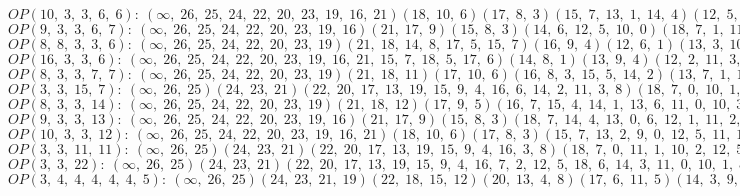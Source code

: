 $OP(10, \;3, \;3, \;6, \;6): \:(\infty, \;26, \;25, \;24, \;22, \;20, \;23, \;19, \;16, \;21)(18, \;10, \;6)(17, \;8, \;3)(15, \;7, \;13, \;1, \;14, \;4)(12, \;5, \;11, \;0, \;9, \;2)$\\
$OP(9, \;3, \;3, \;6, \;7): \:(\infty, \;26, \;25, \;24, \;22, \;20, \;23, \;19, \;16)(21, \;17, \;9)(15, \;8, \;3)(14, \;6, \;12, \;5, \;10, \;0)(18, \;7, \;1, \;11, \;2, \;13, \;4)$\\
$OP(8, \;8, \;3, \;3, \;6): \:(\infty, \;26, \;25, \;24, \;22, \;20, \;23, \;19)(21, \;18, \;14, \;8, \;17, \;5, \;15, \;7)(16, \;9, \;4)(12, \;6, \;1)(13, \;3, \;10, \;2, \;11, \;0)$\\
$OP(16, \;3, \;3, \;6): \:(\infty, \;26, \;25, \;24, \;22, \;20, \;23, \;19, \;16, \;21, \;15, \;7, \;18, \;5, \;17, \;6)(14, \;8, \;1)(13, \;9, \;4)(12, \;2, \;11, \;3, \;10, \;0)$\\
$OP(8, \;3, \;3, \;7, \;7): \:(\infty, \;26, \;25, \;24, \;22, \;20, \;23, \;19)(21, \;18, \;11)(17, \;10, \;6)(16, \;8, \;3, \;15, \;5, \;14, \;2)(13, \;7, \;1, \;12, \;4, \;9, \;0)$\\
$OP(3, \;3, \;15, \;7): \:(\infty, \;26, \;25)(24, \;23, \;21)(22, \;20, \;17, \;13, \;19, \;15, \;9, \;4, \;16, \;6, \;14, \;2, \;11, \;3, \;8)(18, \;7, \;0, \;10, \;1, \;12, \;5)$\\
$OP(8, \;3, \;3, \;14): \:(\infty, \;26, \;25, \;24, \;22, \;20, \;23, \;19)(21, \;18, \;12)(17, \;9, \;5)(16, \;7, \;15, \;4, \;14, \;1, \;13, \;6, \;11, \;0, \;10, \;3, \;8, \;2)$\\
$OP(9, \;3, \;3, \;13): \:(\infty, \;26, \;25, \;24, \;22, \;20, \;23, \;19, \;16)(21, \;17, \;9)(15, \;8, \;3)(18, \;7, \;14, \;4, \;13, \;0, \;6, \;12, \;1, \;11, \;2, \;10, \;5)$\\
$OP(10, \;3, \;3, \;12): \:(\infty, \;26, \;25, \;24, \;22, \;20, \;23, \;19, \;16, \;21)(18, \;10, \;6)(17, \;8, \;3)(15, \;7, \;13, \;2, \;9, \;0, \;12, \;5, \;11, \;1, \;14, \;4)$\\
$OP(3, \;3, \;11, \;11): \:(\infty, \;26, \;25)(24, \;23, \;21)(22, \;20, \;17, \;13, \;19, \;15, \;9, \;4, \;16, \;3, \;8)(18, \;7, \;0, \;11, \;1, \;10, \;2, \;12, \;5, \;14, \;6)$\\
$OP(3, \;3, \;22): \:(\infty, \;26, \;25)(24, \;23, \;21)(22, \;20, \;17, \;13, \;19, \;15, \;9, \;4, \;16, \;7, \;2, \;12, \;5, \;18, \;6, \;14, \;3, \;11, \;0, \;10, \;1, \;8)$\\
$OP(3, \;4, \;4, \;4, \;4, \;4, \;5): \:(\infty, \;26, \;25)(24, \;23, \;21, \;19)(22, \;18, \;15, \;12)(20, \;13, \;4, \;8)(17, \;6, \;11, \;5)(14, \;3, \;9, \;1)(16, \;7, \;0, \;10, \;2)$\\
